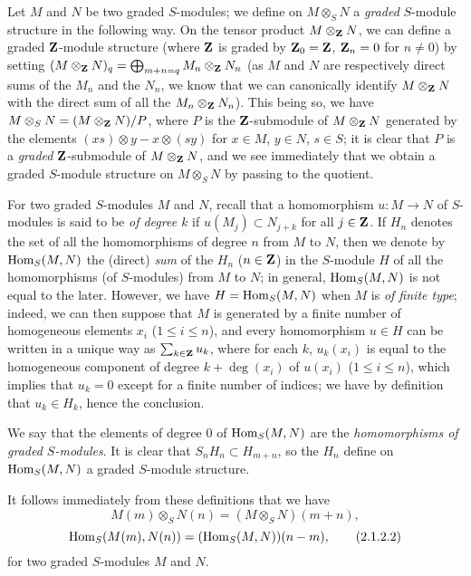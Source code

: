 \begin{env}[2.1.2]
\label{II.2.1.2}
Let $M$ and $N$ be two graded $S$-modules;
we define on $M\otimes_S N$ a \emph{graded} $S$-module structure in the following way.
On the tensor product $M\otimes_\mathbf{Z}N$, we can define a graded $\mathbf{Z}$-module structure (where $\mathbf{Z}$ is graded by $\mathbf{Z}_0=\mathbf{Z}$, $\mathbf{Z}_n=0$ for $n\neq 0$) by setting $(M\otimes_\mathbf{Z}N)_q=\bigoplus_{m+n=q}M_n\otimes_\mathbf{Z}N_n$ (as $M$ and $N$ are respectively direct sums of the $M_n$ and the $N_n$, we know that we can canonically identify $M\otimes_\mathbf{Z}N$ with the direct sum of all the $M_n\otimes_\mathbf{Z}N_n$).
This being so, we have $M\otimes_S N=(M\otimes_\mathbf{Z}N)/P$, where $P$ is the $\mathbf{Z}$-submodule of $M\otimes_\mathbf{Z}N$ generated by the elements $(xs)\otimes y-x\otimes(sy)$ for $x\in M$, $y\in N$, $s\in S$;
it is clear that $P$ is a \emph{graded} $\mathbf{Z}$-submodule of $M\otimes_\mathbf{Z}N$, and we see immediately that we obtain a graded $S$-module structure on $M\otimes_S N$ by passing to the quotient.

For two graded $S$-modules $M$ and $N$, recall that a homomorphism $u:M\to N$ of $S$-modules is said to be \emph{of degree $k$} if $u(M_j)\subset N_{j+k}$ for all $j\in\mathbf{Z}$.
If $H_n$ denotes the set of all the homomorphisms of degree $n$ from $M$ to $N$, then we denote by $\operatorname{Hom}_S(M,N)$ the (direct) \emph{sum} of the $H_n$ ($n\in\mathbf{Z}$) in the $S$-module $H$ of all the homomorphisms (of $S$-modules) from $M$ to $N$;
in general, $\operatorname{Hom}_S(M,N)$ is not equal to the later.
However, we have $H=\operatorname{Hom}_S(M,N)$ when $M$ is \emph{of finite type};
indeed, we can then suppose that $M$ is generated by a finite number of homogeneous elements $x_i$ ($1\leq i\leq n$), and every homomorphism $u\in H$ can be written in a unique way as $\sum_{k\in\mathbf{Z}}u_k$, where for each $k$, $u_k(x_i)$ is equal to the homogeneous component of degree $k+\deg(x_i)$ of $u(x_i)$ ($1\leq i\leq n$), which implies that $u_k=0$ except for a finite number of indices;
we have by definition that $u_k\in H_k$, hence the conclusion.

We say that the elements of degree $0$ of $\operatorname{Hom}_S(M,N)$ are the \emph{homomorphisms of graded $S$-modules}.
It is clear that $S_n H_n\subset H_{m+n}$, so the $H_n$ define on $\operatorname{Hom}_S(M,N)$ a graded $S$-module structure.

It follows immediately from these definitions that we have
\[
\label{II.2.1.2.1}
  M(m)\otimes_S N(n)=(M\otimes_S N)(m+n),
  \tag{2.1.2.1}
\]
\[
\label{II.2.1.2.2}
  \operatorname{Hom}_S(M(m),N(n))=(\operatorname{Hom}_S(M,N))(n-m),
  \tag{2.1.2.2}
\]
for two graded $S$-modules $M$ and $N$.


\end{env}
